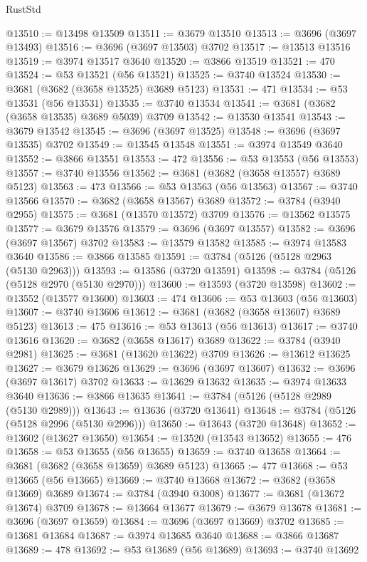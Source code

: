 \begin{lexlean}{RustStd}
\begin{coremodule}
@13510 := @13498 @13509
@13511 := @3679 @13510
@13513 := @3696 (@3697 @13493)
@13516 := @3696 (@3697 @13503) @3702
@13517 := @13513 @13516
@13519 := @3974 @13517 @3640
@13520 := @3866 @13519
@13521 := 470
@13524 := @53 @13521 (@56 @13521)
@13525 := @3740 @13524
@13530 := @3681 (@3682 (@3658 @13525) @3689 @5123)
@13531 := 471
@13534 := @53 @13531 (@56 @13531)
@13535 := @3740 @13534
@13541 := @3681 (@3682 (@3658 @13535) @3689 @5039) @3709
@13542 := @13530 @13541
@13543 := @3679 @13542
@13545 := @3696 (@3697 @13525)
@13548 := @3696 (@3697 @13535) @3702
@13549 := @13545 @13548
@13551 := @3974 @13549 @3640
@13552 := @3866 @13551
@13553 := 472
@13556 := @53 @13553 (@56 @13553)
@13557 := @3740 @13556
@13562 := @3681 (@3682 (@3658 @13557) @3689 @5123)
@13563 := 473
@13566 := @53 @13563 (@56 @13563)
@13567 := @3740 @13566
@13570 := @3682 (@3658 @13567) @3689
@13572 := @3784 (@3940 @2955)
@13575 := @3681 (@13570 @13572) @3709
@13576 := @13562 @13575
@13577 := @3679 @13576
@13579 := @3696 (@3697 @13557)
@13582 := @3696 (@3697 @13567) @3702
@13583 := @13579 @13582
@13585 := @3974 @13583 @3640
@13586 := @3866 @13585
@13591 := @3784 (@5126 (@5128 @2963 (@5130 @2963)))
@13593 := @13586 (@3720 @13591)
@13598 := @3784 (@5126 (@5128 @2970 (@5130 @2970)))
@13600 := @13593 (@3720 @13598)
@13602 := @13552 (@13577 @13600)
@13603 := 474
@13606 := @53 @13603 (@56 @13603)
@13607 := @3740 @13606
@13612 := @3681 (@3682 (@3658 @13607) @3689 @5123)
@13613 := 475
@13616 := @53 @13613 (@56 @13613)
@13617 := @3740 @13616
@13620 := @3682 (@3658 @13617) @3689
@13622 := @3784 (@3940 @2981)
@13625 := @3681 (@13620 @13622) @3709
@13626 := @13612 @13625
@13627 := @3679 @13626
@13629 := @3696 (@3697 @13607)
@13632 := @3696 (@3697 @13617) @3702
@13633 := @13629 @13632
@13635 := @3974 @13633 @3640
@13636 := @3866 @13635
@13641 := @3784 (@5126 (@5128 @2989 (@5130 @2989)))
@13643 := @13636 (@3720 @13641)
@13648 := @3784 (@5126 (@5128 @2996 (@5130 @2996)))
@13650 := @13643 (@3720 @13648)
@13652 := @13602 (@13627 @13650)
@13654 := @13520 (@13543 @13652)
@13655 := 476
@13658 := @53 @13655 (@56 @13655)
@13659 := @3740 @13658
@13664 := @3681 (@3682 (@3658 @13659) @3689 @5123)
@13665 := 477
@13668 := @53 @13665 (@56 @13665)
@13669 := @3740 @13668
@13672 := @3682 (@3658 @13669) @3689
@13674 := @3784 (@3940 @3008)
@13677 := @3681 (@13672 @13674) @3709
@13678 := @13664 @13677
@13679 := @3679 @13678
@13681 := @3696 (@3697 @13659)
@13684 := @3696 (@3697 @13669) @3702
@13685 := @13681 @13684
@13687 := @3974 @13685 @3640
@13688 := @3866 @13687
@13689 := 478
@13692 := @53 @13689 (@56 @13689)
@13693 := @3740 @13692

\end{coremodule}
\end{lexlean}
